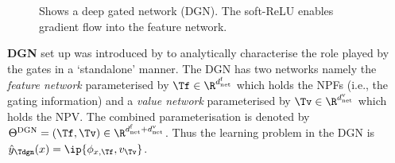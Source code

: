 \begin{figure}[h]
\begin{minipage}{0.26\columnwidth}
{}
\end{minipage}
\caption{\small{Shows a deep gated network (DGN). The soft-ReLU enables gradient flow into the feature network.}}
\label{fig:dgn}
\end{figure}

\textbf{DGN} set up was introduced by  to  analytically characterise the role played by the gates in a `standalone' manner. The DGN has two networks namely the \emph{feature network} parameterised by $\Tf\in\R^{d^{\text{f}}_{\text{net}}}$ which holds the NPFs (i.e., the gating information) and a \emph{value network} parameterised by $\Tv\in\R^{d^{\text{v}}_{\text{net}}}$ which holds the NPV.  The combined parameterisation is denoted by $\Theta^{\text{DGN}}=(\Tf,\Tv)\in \R^{d^{\text{f}}_{\text{net}}+d^{\text{v}}_{\text{net}}}$.  Thus the learning problem in the DGN is $\hat{y}_{\Tdgn}(x)=\ip{\phi_{x,\Tf},v_{\Tv}}$. 


